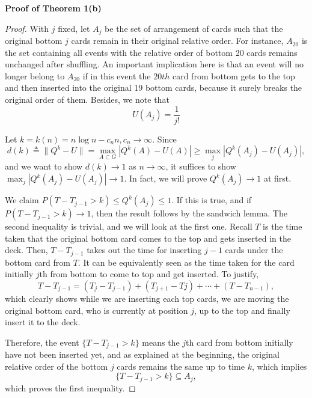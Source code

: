 \documentclass[12pt]{article}
\theoremstyle{plain}
\theoremstyle{definition}
\theoremstyle{remark}
\begin{document}
\textbf{Proof of Theorem 1(b)}
\begin{proof}
With $j$ fixed, let $A_j$ be the set of arrangement of cards such that the original bottom $j$ cards remain in their original relative order. For instance, $A_{20}$ is the set containing all events with the relative order of bottom 20 cards remains unchanged after shuffling. An important implication here is that an event will no longer belong to $A_{20}$ if in this event the $20th$ card from bottom gets to the top and then inserted into the original 19 bottom cards, because it surely breaks the original order of them. Besides, we note that $$U(A_j)=\frac{1}{j!}$$

Let $k=k(n)=n\log n-c_nn,c_n\rightarrow\infty.$ Since $$d(k)\triangleq \|Q^k-U\|=
    \max_{A\subset G}|Q^k(A)-U(A)|\geq \max_{j}|Q^k(A_j)-U(A_j)|,$$
and we want to show $d(k)\rightarrow 1$ as $n\rightarrow \infty$, it suffices to show $\max_{j}|Q^k(A_j)-U(A_j)|\rightarrow 1$. In fact, we will prove $Q^k(A_j)\rightarrow 1$ at first. 

We claim $P(T-T_{j-1}>k)\leq Q^k(A_j)\leq 1$. If this is true, and if $P(T-T_{j-1}>k)\longrightarrow 1$, then the result follows by the sandwich lemma. The second inequality is trivial, and we will look at the first one. Recall $T$ is the time taken that the original bottom card comes to the top and gets inserted in the deck. Then, $T-T_{j-1}$ takes out the time for inserting $j-1$ cards under the bottom card from $T$. It can be equivalently seen as the time taken for the card initially $j$th from bottom to come to top and get inserted. To justify, $$T-T_{j-1}=(T_j-T_{j-1})+(T_{j+1}-T{j})+\cdots+(T-T_{n-1}),$$ 
which clearly shows while we are inserting each top cards, we are moving the original bottom card, who is currently at position $j$, up to the top and finally insert it to the deck.  

Therefore, the event $\{T-T_{j-1}>k\}$ means the $j$th card from bottom initially have not been inserted yet, and as explained at the beginning, the original relative order of the bottom $j$ cards remains the same up to time $k$, which implies $$\{T-T_{j-1}>k\}\subseteq A_j,$$
which proves the first inequality. 


\end{proof}
\end{document}
